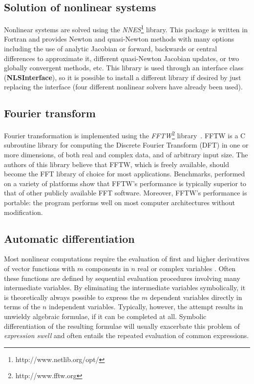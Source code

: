 \subsection{Solution of nonlinear systems}

Nonlinear systems are solved using the
\emph{NNES}\footnote{http://www.netlib.org/opt/} \cite{NNES}
library. This package is written in Fortran and provides Newton and
quasi-Newton methods with many options including the use of analytic
Jacobian or forward, backwards or central differences to approximate
it, different quasi-Newton Jacobian updates, or two globally
convergent methods, etc.  This library is used through an interface
class ({\bf NLSInterface}), so it is possible to install a different
library if desired by just replacing the interface (four different
nonlinear solvers have already been used).

\subsection{Fourier transform}

Fourier transformation is implemented using the
\emph{FFTW}\footnote{http://www.fftw.org} library~\cite{FFTW}. FFTW is
a C subroutine library for computing the Discrete Fourier Transform
(DFT) in one or more dimensions, of both real and complex data, and of
arbitrary input size. The authors of this library believe that FFTW,
which is freely available, should become the FFT library of choice for
most applications. Benchmarks, performed on a variety of platforms
show that FFTW's performance is typically superior to that of other
publicly available FFT software. Moreover, FFTW's performance is
portable: the program performs well on most computer architectures
without modification.

\subsection{Automatic differentiation} \label{sec:adolc}

Most nonlinear computations require the evaluation of first and higher
derivatives of vector functions with $m$ components in $n$ real or
complex variables \cite{adol-c:96}.  Often these functions are defined
by sequential evaluation procedures involving many intermediate
variables. By eliminating the intermediate variables symbolically, it
is theoretically always possible to express the $m$ dependent
variables directly in terms of the $n$ independent
variables. Typically, however, the attempt results in unwieldy
algebraic formulae, if it can be completed at all. Symbolic
differentiation of the resulting formulae will usually exacerbate
this problem of \emph{expression swell} and often entails the repeated
evaluation of common expressions.


